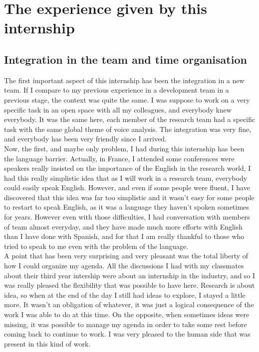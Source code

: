 \documentclass{report}
\begin{document}
	
	\chapter{The experience given by this internship}
	
	\section{Integration in the team and time organisation}
	
	The first important aspect of this internship has been the integration in a new team. If I compare to my previous experience in a development team in a previous stage, the context was quite the same. I was suppose to work on a very specific task in an open space with all my colleagues, and everybody knew everybody. It was the same here, each member of the research team had a specific task with the same global theme of voice analysis. The integration was very fine, and everybody has been very friendly since I arrived.\\
	
	Now, the first, and maybe only problem, I had during this internship has been the language barrier. Actually, in France, I attended some conferences were speakers really insisted on the importance of the English in the research world, I had this really simplistic idea that as I will work in a research team, everybody could easily speak English. However, and even if some people were fluent, I have discovered that this idea was far too simplistic and it wasn't easy for some people to restart to speak English, as it was a language they haven't spoken sometimes for years. However even with those difficulties, I had conversation with members of team almost everyday, and they have made much more efforts with English than I have done with Spanish, and for that I am really thankful to those who tried to speak to me even with the problem of the language.\\
	
	A point that has been very surprising and very pleasant was the total liberty of how I could organize my agenda. All the discussions I had with my classmates about their third year intership were about an internship in the industry, and so I was really pleased the flexibility that was possible to have here. Research is about idea, so when at the end of the day I still had ideas to explore, I stayed a little more. It wasn't an obligation of whatever, it was just a logical consequence of the work I was able to do at this time. On the opposite, when sometimes ideas were missing, it was possible to manage my agenda in order to take some rest before coming back to continue to work. I was very pleased to the human side that was present in this kind of work.
	
\end{document}
